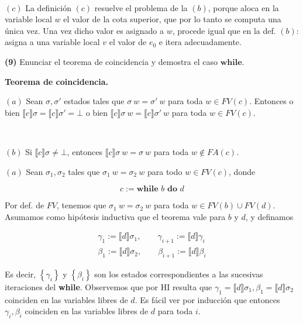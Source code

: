 \documentclass[article, 12pt]{article}
\begin{document}
~

$(c)$ La definición $(c)$ resuelve el problema de la $(b)$, porque aloca en la
variable local $w$ el valor de la cota superior, que por lo tanto se computa una
única vez. Una vez dicho valor es asignado a $w$, procede igual que en la def.
$(b)$: asigna a una variable local $v$ el valor de $e_0$ e itera adecuadamente.

\pagebreak 

\begin{myframe}
  \textbf{(9)} Enunciar el teorema de coincidencia  y demostra el caso $\textbf{while}$.
\end{myframe}

\begin{helpframe}
  \textbf{Teorema de coincidencia.} 

  $(a)$ Sean $\sigma, \sigma'$ estados tales
  que $\sigma ~ w = \sigma' ~ w$ para toda $w \in FV(c)$. Entonces o bien 
  $\llbracket c \rrbracket\sigma = \llbracket c \rrbracket\sigma' = \bot $ o
  bien 
  $\llbracket c \rrbracket\sigma ~ w = \llbracket c \rrbracket\sigma' ~ w$ para
  toda $w \in FV(c)$.

  ~

  $(b)$ Si $\llbracket c \rrbracket\sigma \neq \bot $, entonces $\llbracket c
  \rrbracket\sigma ~ w = \sigma ~ w$ para toda $w \not\in  FA(c)$.
\end{helpframe}


$(a)$ Sean $\sigma_1, \sigma_2$ tales que $\sigma_1 ~ w = \sigma_2 ~ w$ para
todo $w \in FV(c)$, donde 

\begin{equation*} c := \textbf{while } b \textbf{ do } d \end{equation*}

Por def. de $FV$, tenemos que $\sigma_1 ~ w = \sigma_2 ~ w$ para toda $w \in
FV(b) \cup FV(d)$. Asumamos como hipótesis inductiva que el teorema vale para
$b$ y $d$, y definamos


\begin{align*}
  \gamma_1 := \llbracket d \rrbracket\sigma_1, \qquad \gamma_{i+1} := \llbracket d
  \rrbracket\gamma_i\\
  \beta_1 := \llbracket d \rrbracket\sigma_2, \qquad \beta_{i+1} := \llbracket d
  \rrbracket\beta_i
\end{align*}

Es decir, $\left\{ \gamma_i \right\} $ y $\left\{ \beta_i \right\} $ son los
estados correspondientes a las sucesivas iteraciones del \textbf{while}.
Observemos que por HI resulta que $\gamma_1 = \llbracket d \rrbracket\sigma_1,
\beta_1 = \llbracket d \rrbracket\sigma_2$ coinciden en las variables libres de
$d$. Es fácil ver por inducción que entonces $\gamma_i, \beta_i$ coinciden en
las variables libres de $d$ para toda $i$.
\end{document}
